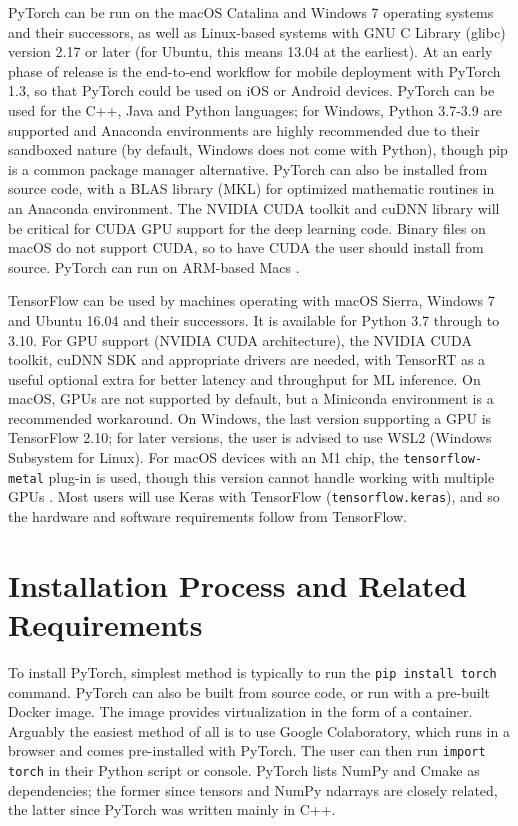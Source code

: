 \documentclass[conference]{IEEEtran}
\begin{document}
PyTorch can be run on the macOS Catalina and Windows 7 operating systems and their successors, as well as Linux-based systems with GNU C Library (glibc) version 2.17 or later (for Ubuntu, this means 13.04 at the earliest). At an early phase of release is the end-to-end workflow for mobile deployment with PyTorch 1.3, so that PyTorch could be used on iOS or Android devices. PyTorch can be used for the C++, Java and Python languages; for Windows, Python 3.7-3.9 are supported and Anaconda environments are highly recommended due to their sandboxed nature (by default, Windows does not come with Python), though pip is a common package manager alternative. PyTorch can also be installed from source code, with a BLAS library (MKL) for optimized mathematic routines in an Anaconda environment. The NVIDIA CUDA toolkit and cuDNN library will be critical for CUDA GPU support for the deep learning code. Binary files on macOS do not support CUDA, so to have CUDA the user should install from source. PyTorch can run on ARM-based Macs \cite{PyTorch-GetStarted}.

TensorFlow can be used by machines operating with macOS Sierra, Windows 7 and Ubuntu 16.04 and their successors. It is available for Python 3.7 through to 3.10. For GPU support (NVIDIA CUDA architecture), the NVIDIA CUDA toolkit, cuDNN SDK and appropriate drivers are needed, with TensorRT as a useful optional extra for better latency and throughput for ML inference. On macOS, GPUs are not supported by default, but a Miniconda environment is a recommended workaround. On Windows, the last version supporting a GPU is TensorFlow 2.10; for later versions, the user is advised to use WSL2 (Windows Subsystem for Linux). For macOS devices with an M1 chip, the \verb+tensorflow-metal+ plug-in is used, though this version cannot handle working with multiple GPUs \cite{Tensorflow-Install}. Most users will use Keras with TensorFlow (\verb+tensorflow.keras+), and so the hardware and software requirements follow from TensorFlow. 

\section{Installation Process and Related Requirements}

To install PyTorch, simplest method is typically to run the \verb+pip install torch+ command. PyTorch can also be built from source code, or run with a pre-built Docker image. The image provides virtualization in the form of a container. Arguably the easiest method of all is to use Google Colaboratory, which runs in a browser and comes pre-installed with PyTorch. The user can then run \verb+import torch+ in their Python script or console. PyTorch lists NumPy and Cmake as dependencies; the former since tensors and NumPy ndarrays are closely related, the latter since PyTorch was written mainly in C++. \cite{PyTorch}
\end{document}
